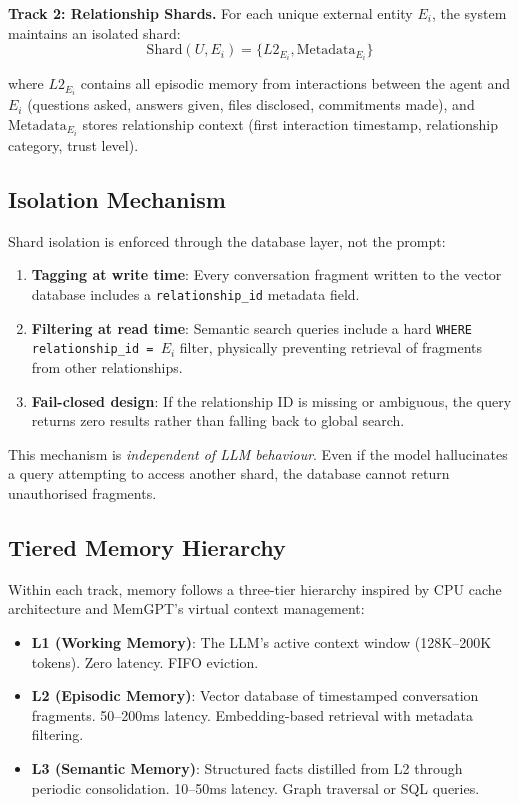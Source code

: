 \textbf{Track 2: Relationship Shards.} For each unique external entity $E_i$, the system maintains an isolated shard:
\[
\text{Shard}(U, E_i) = \{ L2_{E_i}, \text{Metadata}_{E_i} \}
\]

where $L2_{E_i}$ contains all episodic memory from interactions between the agent and $E_i$ (questions asked, answers given, files disclosed, commitments made), and $\text{Metadata}_{E_i}$ stores relationship context (first interaction timestamp, relationship category, trust level).

\subsection{Isolation Mechanism}

Shard isolation is enforced through the database layer, not the prompt:

\begin{enumerate}
    \item \textbf{Tagging at write time}: Every conversation fragment written to the vector database includes a \texttt{relationship\_id} metadata field.
    \item \textbf{Filtering at read time}: Semantic search queries include a hard \texttt{WHERE relationship\_id = $E_i$} filter, physically preventing retrieval of fragments from other relationships.
    \item \textbf{Fail-closed design}: If the relationship ID is missing or ambiguous, the query returns zero results rather than falling back to global search.
\end{enumerate}

This mechanism is \textit{independent of LLM behaviour}. Even if the model hallucinates a query attempting to access another shard, the database cannot return unauthorised fragments.

\subsection{Tiered Memory Hierarchy}

Within each track, memory follows a three-tier hierarchy inspired by CPU cache architecture and MemGPT's \cite{packer2024memgpt} virtual context management:

\begin{itemize}
    \item \textbf{L1 (Working Memory)}: The LLM's active context window (128K--200K tokens). Zero latency. FIFO eviction.
    \item \textbf{L2 (Episodic Memory)}: Vector database of timestamped conversation fragments. 50--200ms latency. Embedding-based retrieval with metadata filtering.
    \item \textbf{L3 (Semantic Memory)}: Structured facts distilled from L2 through periodic consolidation. 10--50ms latency. Graph traversal or SQL queries.
\end{itemize}

